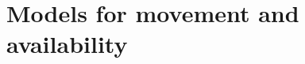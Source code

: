 \documentclass[useAMS, usenatbib, referee]{biom}\usepackage[]{graphicx}\usepackage[]{color}
\begin{document}








\section{Models for movement and availability\label{sec:genmod}}
\end{document}
